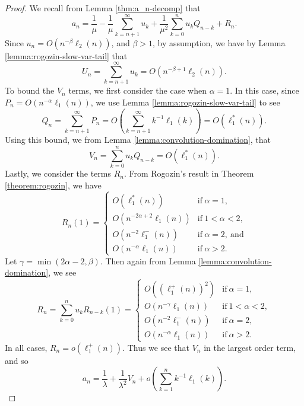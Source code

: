 \begin{proof}
    We recall from Lemma \ref{thm:a_n-decomp} that
    \[
       a_n = \frac{1}{\mu}
           - \frac{1}{\mu}\sum_{k=n+1}^\infty u_k
           + \frac{1}{\mu^2} \sum_{k=0}^n u_k Q_{n-k}
           + R_n.
    \]
    Since $u_n =  O(n^{-\beta}\ell_2(n))$, and $\beta > 1$, by assumption, we have by Lemma \ref{lemma:rogozin-slow-var-tail} that
    \[
        U_n = \sum_{k=n+1}^\infty u_k = O(n^{-\beta+1}\ell_2(n)).
    \]
    To bound the $V_n$ terms, we first consider the case when $\alpha = 1$.
    In this case,
    since $P_n = O(n^{-\alpha}\ell_1(n))$,
    we use Lemma \ref{lemma:rogozin-slow-var-tail} to see
    \[
        Q_n = \sum_{k=n+1}^\infty P_n = O\left(\sum_{k=n+1}^\infty k^{-1}\ell_1(k)\right) = O(\ell_1^*(n)).
    \]
    Using this bound, we from Lemma \ref{lemma:convolution-domination},
    that
    \[
        V_n = \sum_{k=0}^n u_k Q_{n-k} = O(\ell_1^*(n)).
    \]
    Lastly, we consider the terms $R_n$.
    From Rogozin's result in Theorem \ref{theorem:rogozin},
    we have
    \[
        R_n(1) = \begin{cases}
            O(\ell_1^*(n)) & \text{if}\ \alpha = 1,\\
            O(n^{-2\alpha+2}\ell_1(n)) & \text{if}\ 1 < \alpha < 2,\\
            O(n^{-2}\ell_1^-(n)) & \text{if}\ \alpha = 2,\ \text{and}\\
            O(n^{-\alpha}\ell_1(n)) & \text{if}\ \alpha > 2.
        \end{cases}
    \]
    Let $\gamma = \min(2\alpha-2, \beta)$.
    Then again from Lemma \ref{lemma:convolution-domination},
    we see
    \[
        R_n = \sum_{k=0}^n u_k R_{n-k}(1) = \begin{cases}
            O((\ell_1^+(n))^2) & \text{if}\ \alpha = 1,\\
            O(n^{-\gamma}\ell_1(n)) & \text{if}\ 1 < \alpha < 2,\\
            O(n^{-2}\ell_1^-(n)) & \text{if}\ \alpha = 2,\\
            O(n^{-\alpha}\ell_1(n)) & \text{if}\ \alpha > 2.
        \end{cases}
    \]
    In all cases, $R_n = o(\ell_1^+(n))$.
    Thus we see that $V_n$ in the largest order term,
    and so
    \[
        a_n =  \frac{1}{\lambda} + \frac{1}{\lambda^2}V_n + o\left(\sum_{k=1}^n k^{-1}\ell_1(k)\right).
    \]
\end{proof}
